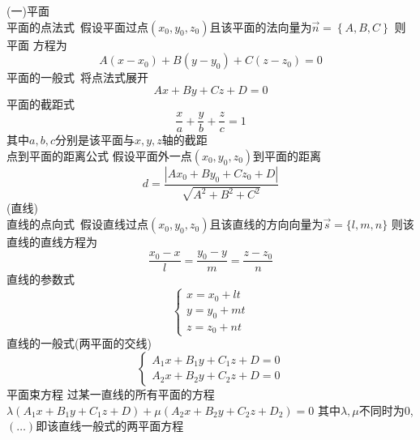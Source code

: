 \documentclass[12pt, a4paper, oneside, UTF8]{ctexbook}
\begin{document}
\begin{tcolorbox}[title=直线与平面]
(一)平面 \\
平面的点法式\ 假设平面过点$(x_0,y_0,z_0)$且该平面的法向量为$\vec{n}=\left\{A,B,C\right\}$ 则平面
方程为
$$
A(x-x_0)+B(y-y_0)+C(z-z_0) = 0
$$
平面的一般式\ 将点法式展开
$$
Ax+By+Cz+D = 0
$$
平面的截距式\  
$$
\frac{x}{a}+\frac{y}{b}+\frac{z}{c} = 1
$$
其中$a,b,c$分别是该平面与$x,y,z$轴的截距 \\
{\color{red} 点到平面的距离公式} 假设平面外一点$(x_0,y_0,z_0)$到平面的距离
$$
d = \frac{\left|Ax_0+By_0+Cz_0+D\right|}{\sqrt{A^2+B^2+C^2}}
$$
(直线) \\
直线的点向式\ 假设直线过点$(x_0,y_0,z_0)$且该直线的方向向量为$\vec{s}=\{l,m,n\}$ 则该直线的直线方程为
$$
\frac{x_0-x}{l}=\frac{y_0-y}{m}=\frac{z-z_0}{n}
$$
直线的参数式 
$$
\begin{cases}
    x = x_0 + lt \\
    y = y_0 + mt \\
    z = z_0 + nt
\end{cases}
$$
直线的一般式(两平面的交线)
$$
\begin{cases}
    A_1x+B_1y+C_1z+D=0 \\
    A_2x+B_2y+C_2z+D=0
\end{cases}
$$
{\color{red} 平面束方程} 过某一直线的所有平面的方程 $\lambda(A_1x+B_1y+C_1z+D)+\mu(A_2x+B_2y+C_2z+D_2) = 0$
其中$\lambda,\mu$不同时为0,$(\ldots)$即该直线一般式的两平面方程
\end{tcolorbox}
\end{document}
